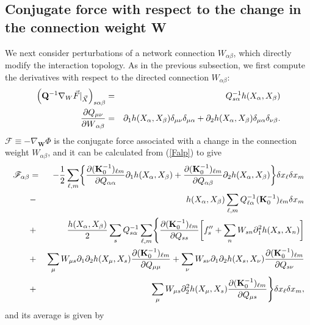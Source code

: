 \subsection{Conjugate force with respect to the change in the connection weight W}
\quad We next consider perturbations of a network connection $W_{\alpha\beta}$, which directly modify the interaction topology. As in the previous subsection, we first compute the derivatives with respect to the directed connection $W_{\alpha\beta}$:
\begin{eqnarray}
\left({\bf Q}^{-1} \nabla_W{\vec { F}} |_{\vec X}\right)_{s\alpha\beta} &=& 
Q_{s\alpha}^{-1}h(X_\alpha, X_\beta)\label{QgradWF}\\
\frac{\partial Q_{\mu\nu}}{\partial W{_{\alpha\beta}}}&=& \partial_1 h(X_\alpha, X_\beta)\delta_{\mu\nu}\delta_{\mu\alpha}+\partial_2h(X_\alpha, X_\beta)\delta_{\mu\alpha}\delta_{\nu\beta}.\label{dQdW}
\end{eqnarray}
$\boldsymbol{{\mathscr F}} \equiv -\nabla_{\mathbf{W}} \Phi$ is the conjugate force associated with a change in the connection weight $W_{\alpha\beta}$, and it can be calculated from (\ref{Falp}) to give
\begin{eqnarray}
{\mathscr F}_{\alpha\beta}&=& -\frac{1}{2}\sum_{\ell,m} \biggl\{\frac{\partial ({\bf K}_0^{-1})_{\ell m}}{\partial Q_{\alpha \alpha}}\partial_1 h(X_\alpha, X_\beta)+ \frac{\partial ({\bf K}_0^{-1})_{\ell m}}{\partial Q_{\alpha \beta}}\partial_2h(X_\alpha, X_\beta)\biggr\} \delta x_\ell \delta x_m \nonumber\\
&-& h(X_\alpha, X_\beta)\sum_{\ell,m} Q^{-1}_{\ell\alpha}({\bf K}_0^{-1})_{\ell m}\delta x_m\\
&+&\frac{ h(X_\alpha, X_\beta)}{2} \sum_s Q_{s\alpha}^{-1}\sum_{\ell,m}  \Biggl\{ \frac{\partial ({\bf K}_0^{-1})_{\ell m}} {\partial Q_{ss}}\biggl[f_s''+\sum_n W_{sn}  \partial^2_1h(X_s,X_n)\biggr]\nonumber\\
&+& \sum_\mu W_{\mu s} \partial_1\partial_2h(X_\mu,X_s)\frac{\partial ({\bf K}_0^{-1})_{\ell m}} {\partial Q_{\mu\mu}} + \sum_\nu W_{s\nu}\partial_1\partial_2h(X_s,X_\nu)\frac{\partial ({\bf K}_0^{-1})_{\ell m}}{\partial Q_{s\nu}}\nonumber\\
&+& \sum_\mu  W_{\mu s}\partial^2_2h(X_\mu,X_s)\frac{\partial ({\bf K}_0^{-1})_{\ell m}}{\partial Q_{\mu s}} 
\Biggr\} \delta x_\ell \delta x_m ,\nonumber
\end{eqnarray}
and its average is given by
